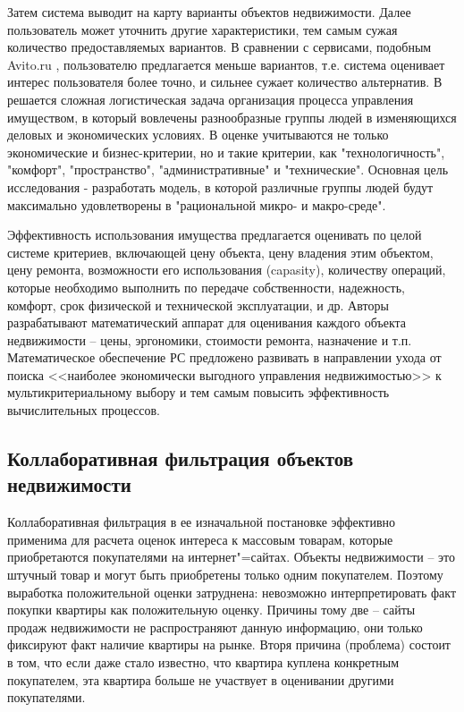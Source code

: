 \documentclass[a4paper,14pt,openany,final]{extreport} %
\begin{document}
Затем система выводит на карту варианты объектов недвижимости. Далее пользователь может уточнить другие характеристики, тем самым сужая количество предоставляемых вариантов. В сравнении с сервисами, подобным Avito.ru \cite{b17}, пользователю предлагается меньше вариантов, т.е. система оценивает интерес пользователя более точно, и сильнее сужает количество альтернатив.
В \cite{b18} решается сложная логистическая задача организация процесса управления имуществом, в который вовлечены разнообразные группы людей в изменяющихся деловых и экономических условиях. В оценке учитываются не только экономические и бизнес-критерии, но и такие критерии, как "технологичность", "комфорт", "пространство", "административные" и "технические". Основная цель исследования - разработать модель, в которой различные группы людей будут максимально удовлетворены в "рациональной микро- и макро-среде".

Эффективность использования имущества предлагается оценивать по целой системе критериев, включающей цену объекта, цену владения этим объектом, цену ремонта, возможности его использования (capasity), количеству операций, которые необходимо выполнить по передаче собственности, надежность, комфорт, срок физической и технической эксплуатации, и др. Авторы разрабатывают математический аппарат для оценивания каждого объекта недвижимости – цены, эргономики, стоимости ремонта, назначение и т.п. Математическое обеспечение РС предложено развивать в направлении ухода от поиска <<наиболее экономически выгодного управления недвижимостью>> к мультикритериальному выбору и тем самым повысить эффективность вычислительных процессов.

\subsection{Коллаборативная фильтрация объектов недвижимости} %
\label{sec:coll-filtering-rspo}

Коллаборативная фильтрация в ее изначальной постановке эффективно применима для расчета оценок интереса к массовым товарам, которые приобретаются покупателями на интернет"=сайтах.  Объекты недвижимости -- это штучный товар и могут быть приобретены только одним покупателем. Поэтому выработка положительной оценки затруднена: невозможно интерпретировать факт покупки квартиры как положительную оценку. Причины тому две -- сайты продаж недвижимости не распространяют данную информацию, они только фиксируют факт наличие квартиры на рынке. Вторя причина (проблема) состоит в том, что если даже стало известно, что квартира куплена конкретным покупателем, эта квартира больше не участвует в оценивании другими покупателями.
\end{document}
